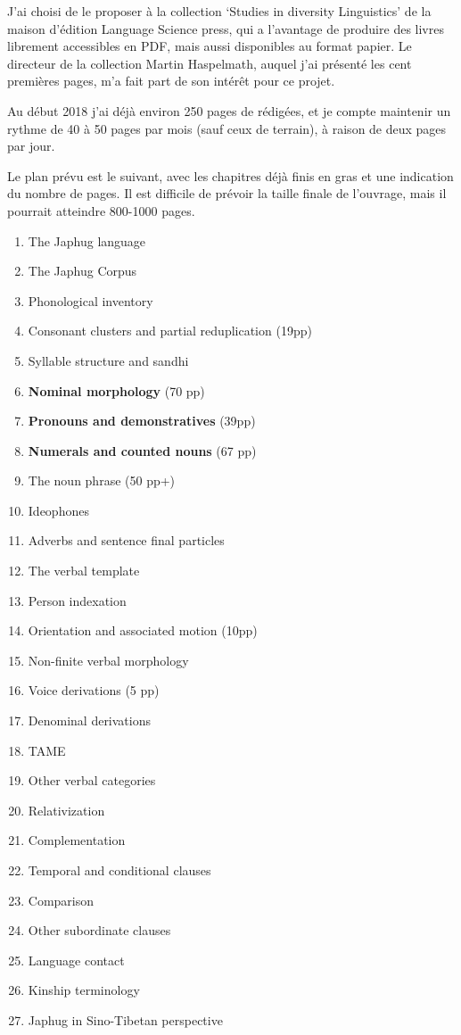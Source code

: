 \documentclass[oldfontcommands,oneside,a4paper,11pt]{article}
\begin{document}
J'ai choisi de le proposer à la collection  `Studies in diversity Linguistics' de la maison d'édition Language Science press, qui a l'avantage de produire des livres librement accessibles en PDF, mais aussi disponibles au format papier. Le directeur de la collection Martin Haspelmath, auquel j'ai présenté les cent premières pages, m'a fait part de son intérêt pour ce projet.

Au début 2018 j'ai déjà environ 250 pages de rédigées, et je compte maintenir un rythme de 40 à 50 pages par mois (sauf ceux de terrain), à raison de deux pages par jour.

Le plan prévu est le suivant, avec les chapitres déjà finis en gras et une indication du nombre de pages. Il est difficile de prévoir la taille finale de l'ouvrage, mais il pourrait atteindre 800-1000 pages.

\begin{enumerate}
\item The Japhug language
\item The Japhug Corpus
\item Phonological inventory 
\item Consonant clusters and partial reduplication (19pp)
\item Syllable structure and sandhi
\item \textbf{Nominal morphology} (70 pp)
\item \textbf{Pronouns and demonstratives}  (39pp)
\item \textbf{Numerals and counted nouns} (67 pp)
\item The noun phrase (50 pp+)
\item Ideophones
\item Adverbs and sentence final particles
\item The verbal template
\item Person indexation
\item Orientation and associated motion (10pp)
\item Non-finite verbal morphology
\item Voice derivations (5 pp)
\item Denominal derivations 
\item TAME
\item Other verbal categories
\item Relativization
\item Complementation
\item Temporal and conditional clauses
\item Comparison
\item Other subordinate clauses
\item Language contact
\item Kinship terminology
\item Japhug in Sino-Tibetan perspective
\end{enumerate}
\end{document}
